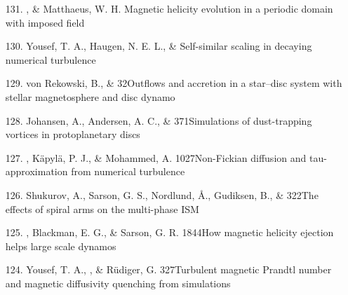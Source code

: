 \begin{itemize}
\item[131.]
\Brandenburg, \& Matthaeus, W. H.
{Magnetic helicity evolution in a periodic domain with imposed field}

\item[130.]
Yousef, T. A., Haugen, N. E. L., \& \Brandenburg{}
{Self-similar scaling in decaying numerical turbulence}

\item[129.]
von Rekowski, B., \& \Brandenburg{}
{32}{Outflows and accretion in a star--disc system with stellar magnetosphere
and disc dynamo}

\item[128.]
Johansen, A., Andersen, A. C., \& \Brandenburg{}
{371}{Simulations of dust-trapping vortices in protoplanetary discs}

\item[127.]
\Brandenburg, K\"apyl\"a, P. J., \& Mohammed, A.
{1027}{Non-Fickian diffusion and tau-approximation from numerical turbulence}

\item[126.]
Shukurov, A., Sarson, G. S., Nordlund, \AA., Gudiksen, B., \& \Brandenburg{}
{322}{The effects of spiral arms on the multi-phase ISM}

\item[125.]
\Brandenburg, Blackman, E. G., \& Sarson, G. R.
{1844}{How magnetic helicity ejection helps large scale dynamos}

\item[124.]
Yousef, T. A., \Brandenburg, \& R\"udiger, G.
{327}{Turbulent magnetic Prandtl number and magnetic diffusivity quenching from simulations}


\end{itemize}
